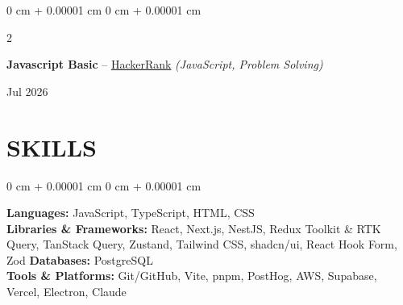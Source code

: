 \documentclass[10pt, letterpaper]{article}
\newenvironment{onecolentry}{
    \begin{adjustwidth}{
        0 cm + 0.00001 cm
    }{
        0 cm + 0.00001 cm
    }
}{
    \end{adjustwidth}
} %
\newenvironment{twocolentry}[2][]{
    \onecolentry
    \def\secondColumn{#2}
    \setcolumnwidth{\fill, 4.5 cm}
    \begin{paracol}{2}
}{
    \switchcolumn \raggedleft \secondColumn
    \end{paracol}
    \endonecolentry
} %
\begin{document}
\vspace{0.10 cm}

\begin{twocolentry}{Jul 2026}
    \textbf{Javascript Basic} -- \href{https://www.hackerrank.com/certificates/44e2b389e12c}{HackerRank} \textit{(JavaScript, Problem Solving)}
\end{twocolentry}

\section{SKILLS}
\begin{onecolentry}
    \textbf{Languages:} JavaScript, TypeScript, HTML, CSS \\
    \textbf{Libraries \& Frameworks:} React, Next.js, NestJS, Redux Toolkit \& RTK Query, TanStack Query, Zustand, Tailwind CSS, shadcn/ui, React Hook Form, Zod
    \textbf{Databases:} PostgreSQL \\
    \textbf{Tools \& Platforms:} Git/GitHub, Vite, pnpm, PostHog, AWS, Supabase, Vercel, Electron, Claude
\end{onecolentry}
\end{document}
